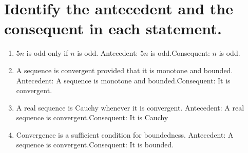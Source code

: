 \documentclass[11pt]{article} %
\begin{document}
\section{Identify the antecedent and the consequent in each statement.}
\begin{enumerate}
	\item$5n$ is odd only if $n$ is odd.
	\subitem Antecedent: $5n$ is odd.\subitem Consequent: $n$ is odd.
	\item A sequence is convergent provided that it is monotone and bounded.
	\subitem Antecedent: A sequence is monotone and bounded.\subitem Consequent: It is convergent.
	\item A real sequence is Cauchy whenever it is convergent.
	\subitem Antecedent: A real sequence is convergent.\subitem Consequent: It is Cauchy
	\item Convergence is a sufficient condition for boundedness.
	\subitem Antecedent: A sequence is convergent.\subitem Consequent: It is bounded.
\end{enumerate}
\end{document}
